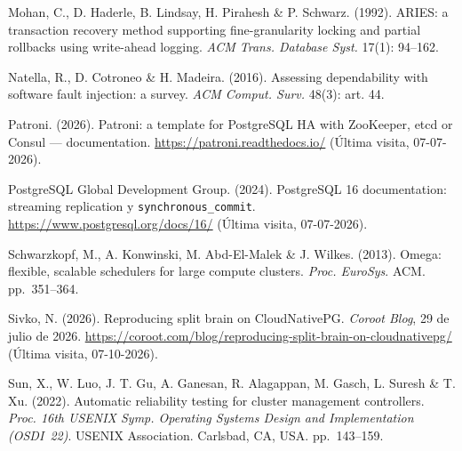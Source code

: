 \documentclass[12pt,twocolumn,letterpaper]{article}
\begin{document}
Mohan, C., D. Haderle, B. Lindsay, H. Pirahesh \& P. Schwarz. (1992). ARIES: a transaction recovery method supporting fine-granularity locking and partial rollbacks using write-ahead logging. \textit{ACM Trans. Database Syst.} 17(1): 94--162.\par
Natella, R., D. Cotroneo \& H. Madeira. (2016). Assessing dependability with software fault injection: a survey. \textit{ACM Comput. Surv.} 48(3): art. 44.\par
Patroni. (2026). Patroni: a template for PostgreSQL HA with ZooKeeper, etcd or Consul --- documentation. \url{https://patroni.readthedocs.io/} (Última visita, 07-07-2026).\par
PostgreSQL Global Development Group. (2024). PostgreSQL 16 documentation: streaming replication y \texttt{synchronous\_commit}. \url{https://www.postgresql.org/docs/16/} (Última visita, 07-07-2026).\par
Schwarzkopf, M., A. Konwinski, M. Abd-El-Malek \& J. Wilkes. (2013). Omega: flexible, scalable schedulers for large compute clusters. \textit{Proc. EuroSys}. ACM. pp.~351--364.\par
Sivko, N. (2026). Reproducing split brain on CloudNativePG. \textit{Coroot Blog}, 29 de julio de 2026. \url{https://coroot.com/blog/reproducing-split-brain-on-cloudnativepg/} (Última visita, 07-10-2026).\par
Sun, X., W. Luo, J. T. Gu, A. Ganesan, R. Alagappan, M. Gasch, L. Suresh \& T. Xu. (2022). Automatic reliability testing for cluster management controllers. \textit{Proc. 16th USENIX Symp. Operating Systems Design and Implementation (OSDI~22)}. USENIX Association. Carlsbad, CA, USA. pp.~143--159.\par
\endgroup
\end{document}
